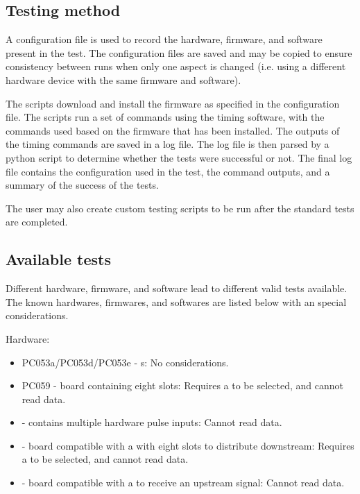 \documentclass{dune}
\begin{document}
\subsection{Testing method}
A configuration file is used to record the hardware, firmware, and software present in the test.
The configuration files are saved and may be copied to ensure consistency between runs when only one aspect is changed (i.e. using a different hardware device with the same firmware and software).

The scripts download and install the firmware as specified in the configuration file.
The scripts run a set of commands using the timing software, with the commands used based on the firmware that has been installed.
The outputs of the timing commands are saved in a log file.
The log file is then parsed by a python script to determine whether the tests were successful or not.
The final log file contains the configuration used in the test, the command outputs, and a summary of the success of the tests.

The user may also create custom testing scripts to be run after the standard tests are completed.

\subsection{Available tests}
Different hardware, firmware, and software lead to different valid tests available.
The known hardwares, firmwares, and softwares are listed below with an special considerations.

Hardware:
\begin{itemize}
    \item PC053a/PC053d/PC053e - s: No considerations.
    \item PC059 - board containing eight  slots: Requires a  to be selected, and cannot read  data.
    \item {} - contains multiple hardware pulse inputs: Cannot read  data.
    \item {} - board compatible with a  with eight  slots to distribute downstream: Requires a  to be selected, and cannot read  data.
    \item {} - board compatible with a  to receive an upstream signal: Cannot read  data.
\end{itemize}
\end{document}

